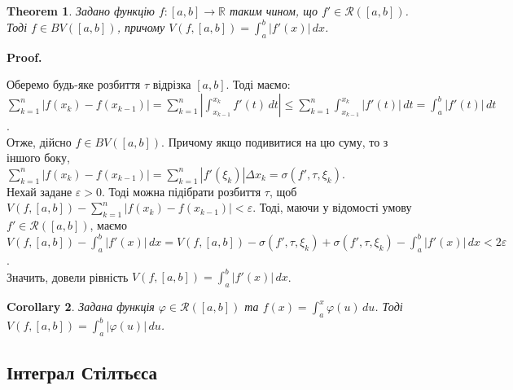 \documentclass[a4paper, 10pt]{article}
\makeatletter
\theoremstyle{theoremdd}
\newtheorem{theorem}{Theorem}[subsection]
\theoremstyle{theoremdd}
\theoremstyle{theoremdd}
\theoremstyle{theoremdd}
\theoremstyle{theoremdd}
\theoremstyle{theoremdd}
\theoremstyle{theoremdd}
\theoremstyle{theoremdd}
\theoremstyle{theoremdd}
\newtheorem{corollary}[theorem]{Corollary}
\renewenvironment{proof}[1][Proof.\\]{\par
\pushQED{\hfill \qed}%
\normalfont \topsep6\p@\@plus6\p@\relax
\trivlist
\item\relax
{\bfseries
#1\@addpunct{.}}\hspace\labelsep\ignorespaces
}{%
\popQED\endtrivlist\@endpefalse
}
\makeatother
\begin{document}
\begin{theorem}
\label{differentiable_integrable_is_bounded_variation}
Задано функцію $f \colon [a,b] \to \mathbb{R}$ таким чином, що $f' \in \mathcal{R}([a,b])$. Тоді $f \in BV([a,b])$, причому $V(f,[a,b]) = \displaystyle\int_a^b |f'(x)|\,dx$.
\end{theorem}

\begin{proof}
Оберемо будь-яке розбиття $\tau$ відрізка $[a,b]$. Тоді маємо:\\
$\displaystyle\sum_{k=1}^n |f(x_k) - f(x_{k-1})| = \sum_{k=1}^n \left|\int_{x_{k-1}}^{x_k} f'(t)\,dt \right| \leq \sum_{k=1}^n \int_{x_{k-1}}^{x_k} |f'(t)|\,dt = \int_a^b |f'(t)|\,dt$.\\
Отже, дійсно $f \in BV([a,b])$. Причому якщо подивитися на цю суму, то з іншого боку,\\
$\displaystyle\sum_{k=1}^n |f(x_k) - f(x_{k-1})| = \sum_{k=1}^n |f'(\xi_k)| \Delta x_k = \sigma(f',\tau,\xi_k)$.\\
Нехай задане $\varepsilon > 0$. Тоді можна підібрати розбиття $\tau$, щоб $V(f,[a,b]) - \displaystyle\sum_{k=1}^n |f(x_k) - f(x_{k-1})| < \varepsilon$. Тоді, маючи у відомості умову $f' \in \mathcal{R}([a,b])$, маємо\\
$V(f,[a,b]) - \displaystyle\int_a^b |f'(x)|\,dx = V(f,[a,b]) - \sigma(f',\tau,\xi_k) + \sigma(f',\tau,\xi_k) - \displaystyle\int_a^b |f'(x)|\,dx < 2\varepsilon$.\\
Значить, довели рівність $V(f,[a,b]) = \displaystyle\int_a^b |f'(x)|\,dx$.
\end{proof}

\begin{corollary}
Задана функція $\varphi \in \mathcal{R}([a,b])$ та $f(x) = \displaystyle\int_a^x \varphi(u)\,du$. Тоді $V(f,[a,b]) = \displaystyle\int_a^b |\varphi(u)|\,du$.
\end{corollary}

\subsection{Інтеграл Стілтьєса}
\end{document}

